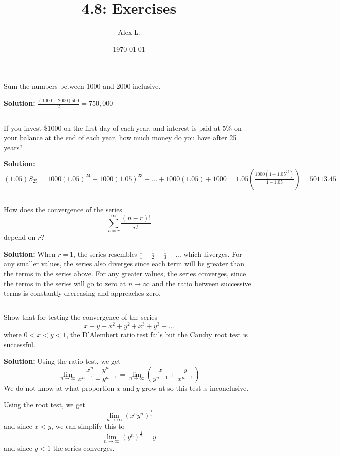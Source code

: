 \documentclass{article}
\title{4.8: Exercises}
\author{Alex L.}
\date{\today}
\begin{document}
\maketitle
\setcounter{section}{4}
\subsection{}Sum the numbers between 1000 and 2000 inclusive.

\textbf{Solution:} $\frac{(1000+2000)500}{2} = 750,000$

\subsection{}
If you invest \$1000 on the first day of each year, and interest is paid at 5\% on your balance at the end of each year, how much money do you have after 25 years?

\textbf{Solution:} $(1.05)S_{25} = 1000(1.05)^24 + 1000(1.05)^23 + ... + 1000(1.05) + 1000 = 1.05(\frac{1000(1-1.05^25)}{1-1.05}) = 50113.45$

\subsection{}
How does the convergence of the series $$\sum_{n=r}^{\infty} \frac{(n-r)!}{n!}$$depend on $r$?

\textbf{Solution:} When $r = 1$, the series resembles $\frac{1}{1} + \frac{1}{2} + \frac{1}{3} + ...$ which diverges. For any smaller values, the series also diverges since each term will be greater than the terms in the series above. For any greater values, the series converges, since the terms in the series will go to zero at $n \to \infty$ and the ratio between successive terms is constantly decreasing and appreaches zero. 

\subsection{}
Show that for testing the convergence of the series$$x + y + x^2 + y^2 + x^3 + y^3 + ... $$where $0 < x < y < 1$, the D'Alembert ratio test fails but the Cauchy root test is successful.

\textbf{Solution:} Using the ratio test, we get $$\lim_{n\to\infty} \frac{x^n+y^n}{x^{n-1}+y^{n-1}} = \lim_{n\to\infty} (\frac{x}{y^{n-1}}+\frac{y}{x^{n-1}})$$We do not know at what proportion $x$ and $y$ grow at so this test is inconclusive.

Using the root test, we get $$\lim_{n\to\infty}(x^n y^n)^{\frac{1}{n}}$$and since $x < y$, we can simplify this to $$\lim_{n\to\infty}(y^n)^\frac{1}{n} = y$$and since $y<1$ the series converges. 
\end{document}
